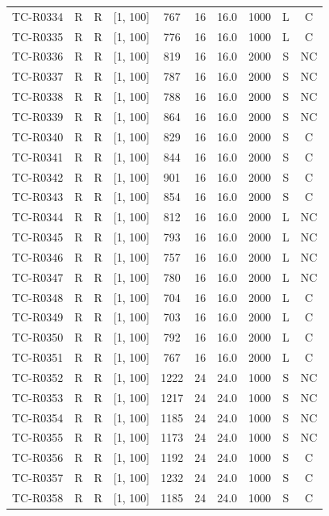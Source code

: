 \begin{longtable}{lccccccccc}
TC-R0334 & R & R & [1, 100] & 767 & 16 & 16.0 & 1000 & L & C \\
TC-R0335 & R & R & [1, 100] & 776 & 16 & 16.0 & 1000 & L & C \\
TC-R0336 & R & R & [1, 100] & 819 & 16 & 16.0 & 2000 & S & NC \\
TC-R0337 & R & R & [1, 100] & 787 & 16 & 16.0 & 2000 & S & NC \\
TC-R0338 & R & R & [1, 100] & 788 & 16 & 16.0 & 2000 & S & NC \\
TC-R0339 & R & R & [1, 100] & 864 & 16 & 16.0 & 2000 & S & NC \\
TC-R0340 & R & R & [1, 100] & 829 & 16 & 16.0 & 2000 & S & C \\
TC-R0341 & R & R & [1, 100] & 844 & 16 & 16.0 & 2000 & S & C \\
TC-R0342 & R & R & [1, 100] & 901 & 16 & 16.0 & 2000 & S & C \\
TC-R0343 & R & R & [1, 100] & 854 & 16 & 16.0 & 2000 & S & C \\
TC-R0344 & R & R & [1, 100] & 812 & 16 & 16.0 & 2000 & L & NC \\
TC-R0345 & R & R & [1, 100] & 793 & 16 & 16.0 & 2000 & L & NC \\
TC-R0346 & R & R & [1, 100] & 757 & 16 & 16.0 & 2000 & L & NC \\
TC-R0347 & R & R & [1, 100] & 780 & 16 & 16.0 & 2000 & L & NC \\
TC-R0348 & R & R & [1, 100] & 704 & 16 & 16.0 & 2000 & L & C \\
TC-R0349 & R & R & [1, 100] & 703 & 16 & 16.0 & 2000 & L & C \\
TC-R0350 & R & R & [1, 100] & 792 & 16 & 16.0 & 2000 & L & C \\
TC-R0351 & R & R & [1, 100] & 767 & 16 & 16.0 & 2000 & L & C \\
TC-R0352 & R & R & [1, 100] & 1222 & 24 & 24.0 & 1000 & S & NC \\
TC-R0353 & R & R & [1, 100] & 1217 & 24 & 24.0 & 1000 & S & NC \\
TC-R0354 & R & R & [1, 100] & 1185 & 24 & 24.0 & 1000 & S & NC \\
TC-R0355 & R & R & [1, 100] & 1173 & 24 & 24.0 & 1000 & S & NC \\
TC-R0356 & R & R & [1, 100] & 1192 & 24 & 24.0 & 1000 & S & C \\
TC-R0357 & R & R & [1, 100] & 1232 & 24 & 24.0 & 1000 & S & C \\
TC-R0358 & R & R & [1, 100] & 1185 & 24 & 24.0 & 1000 & S & C \\

\end{longtable}

